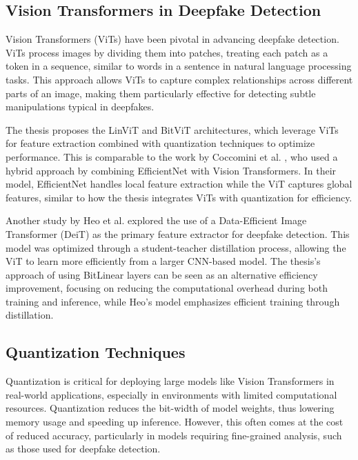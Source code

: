 \documentclass[conference]{IEEEtran}
\begin{document}
		
		
		
		\subsection{Vision Transformers in Deepfake Detection}
		Vision Transformers (ViTs) have been pivotal in advancing deepfake detection. ViTs process images by dividing them into patches, treating each patch as a token in a sequence, similar to words in a sentence in natural language processing tasks. This approach allows ViTs to capture complex relationships across different parts of an image, making them particularly effective for detecting subtle manipulations typical in deepfakes.
		
		The thesis proposes the LinViT and BitViT architectures, which leverage ViTs for feature extraction combined with quantization techniques to optimize performance. This is comparable to the work by Coccomini et al. \cite{ref1}, who used a hybrid approach by combining EfficientNet with Vision Transformers. In their model, EfficientNet handles local feature extraction while the ViT captures global features, similar to how the thesis integrates ViTs with quantization for efficiency.
		
		
		Another study by Heo et al. \cite{ref2} explored the use of a Data-Efficient Image Transformer (DeiT) as the primary feature extractor for deepfake detection. This model was optimized through a student-teacher distillation process, allowing the ViT to learn more efficiently from a larger CNN-based model. The thesis’s approach of using BitLinear layers can be seen as an alternative efficiency improvement, focusing on reducing the computational overhead during both training and inference, while Heo’s model emphasizes efficient training through distillation.
		
		
		
		\subsection{Quantization Techniques}
		Quantization is critical for deploying large models like Vision Transformers in real-world applications, especially in environments with limited computational resources. Quantization reduces the bit-width of model weights, thus lowering memory usage and speeding up inference. However, this often comes at the cost of reduced accuracy, particularly in models requiring fine-grained analysis, such as those used for deepfake detection.
		
\end{document}
